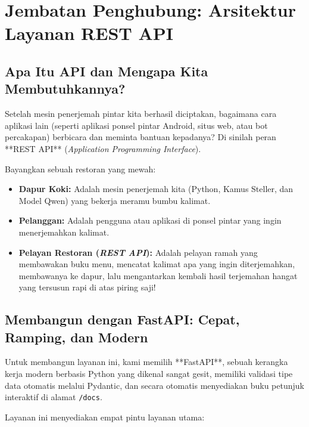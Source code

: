 \chapter{Jembatan Penghubung: Arsitektur Layanan REST API}

\section{Apa Itu API dan Mengapa Kita Membutuhkannya?}
Setelah mesin penerjemah pintar kita berhasil diciptakan, bagaimana cara aplikasi lain (seperti aplikasi ponsel pintar Android, situs web, atau bot percakapan) berbicara dan meminta bantuan kepadanya? Di sinilah peran **REST API** (\textit{Application Programming Interface}).

\begin{infobox}
Bayangkan sebuah restoran yang mewah:
\begin{itemize}
    \item \textbf{Dapur Koki:} Adalah mesin penerjemah kita (Python, Kamus Steller, dan Model Qwen) yang bekerja meramu bumbu kalimat.
    \item \textbf{Pelanggan:} Adalah pengguna atau aplikasi di ponsel pintar yang ingin menerjemahkan kalimat.
    \item \textbf{Pelayan Restoran (\textit{REST API}):} Adalah pelayan ramah yang membawakan buku menu, mencatat kalimat apa yang ingin diterjemahkan, membawanya ke dapur, lalu mengantarkan kembali hasil terjemahan hangat yang tersusun rapi di atas piring saji!
\end{itemize}
\end{infobox}

\section{Membangun dengan FastAPI: Cepat, Ramping, dan Modern}
Untuk membangun layanan ini, kami memilih **FastAPI**, sebuah kerangka kerja modern berbasis Python yang dikenal sangat gesit, memiliki validasi tipe data otomatis melalui Pydantic, dan secara otomatis menyediakan buku petunjuk interaktif di alamat \texttt{/docs}.

Layanan ini menyediakan empat pintu layanan utama:

